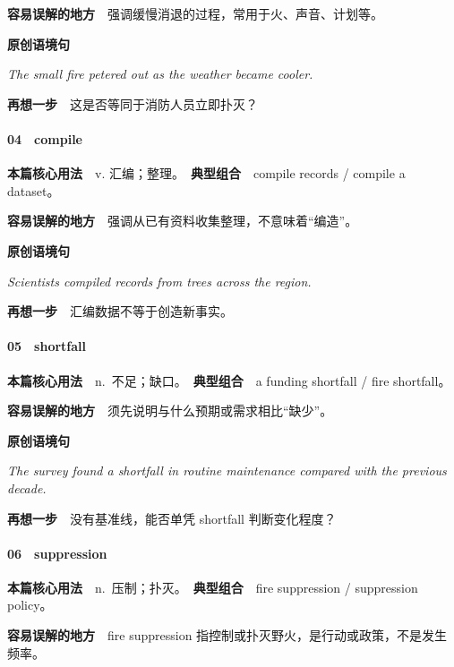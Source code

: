 \documentclass[
  11pt,
]{ctexart}
\renewenvironment{quote}{\begin{tcolorbox}[enhanced,breakable,colback=sand,colframe=primary!22,boxrule=0.4pt,arc=2pt,left=2.6mm,right=2.6mm,top=1.6mm,bottom=1.6mm]\itshape}{\end{tcolorbox}}
\begin{document}
\textbf{容易误解的地方}　强调缓慢消退的过程，常用于火、声音、计划等。

\textbf{原创语境句}

\begin{quote}
The small fire petered out as the weather became cooler.
\end{quote}

\textbf{再想一步}　这是否等同于消防人员立即扑灭？

\paragraph{04　compile}\label{compile}

\textbf{本篇核心用法}　v. 汇编；整理。　\textbf{典型组合}　compile
records / compile a dataset。

\textbf{容易误解的地方}　强调从已有资料收集整理，不意味着``编造''。

\textbf{原创语境句}

\begin{quote}
Scientists compiled records from trees across the region.
\end{quote}

\textbf{再想一步}　汇编数据不等于创造新事实。

\paragraph{05　shortfall}\label{shortfall}

\textbf{本篇核心用法}　n.~不足；缺口。　\textbf{典型组合}　a funding
shortfall / fire shortfall。

\textbf{容易误解的地方}　须先说明与什么预期或需求相比``缺少''。

\textbf{原创语境句}

\begin{quote}
The survey found a shortfall in routine maintenance compared with the
previous decade.
\end{quote}

\textbf{再想一步}　没有基准线，能否单凭 shortfall 判断变化程度？

\paragraph{06　suppression}\label{suppression}

\textbf{本篇核心用法}　n.~压制；扑灭。　\textbf{典型组合}　fire
suppression / suppression policy。

\textbf{容易误解的地方}　fire suppression
指控制或扑灭野火，是行动或政策，不是发生频率。
\end{document}
